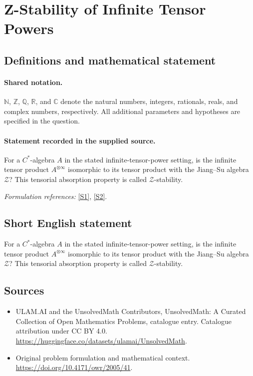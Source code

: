 \documentclass[11pt]{article}
\newcommand{\sref}[2]{\hyperlink{source:#1:#2}{[S#2]}}
\begin{document}
\section{Z-Stability of Infinite Tensor Powers}\label{statement}

\subsection{Definitions and mathematical statement}

\paragraph{Shared notation.}$\mathbb N$, $\mathbb Z$, $\mathbb Q$, $\mathbb R$, and $\mathbb C$ denote the natural numbers, integers, rationals, reals, and complex numbers, respectively. All additional parameters and hypotheses are specified in the question.


\paragraph{Statement recorded in the supplied source.}
For a $C^*$-algebra $A$ in the stated infinite-tensor-power setting, is the infinite tensor product $A^{\otimes\infty}$ isomorphic to its tensor product with the Jiang--Su algebra $\mathcal Z$? This tensorial absorption property is called $\mathcal Z$-stability.
\par\smallskip\textit{Formulation references:} \sref{statement}{1}, \sref{statement}{2}.
\subsection{Short English statement}
For a $C^*$-algebra $A$ in the stated infinite-tensor-power setting, is the infinite tensor product $A^{\otimes\infty}$ isomorphic to its tensor product with the Jiang--Su algebra $\mathcal Z$? This tensorial absorption property is called $\mathcal Z$-stability.
\subsection{Sources}
\begin{itemize}
\item[\hypertarget{source:statement:1}{S1}] ULAM.AI and the UnsolvedMath Contributors, UnsolvedMath: A Curated Collection of Open Mathematics Problems, catalogue entry. Catalogue attribution under CC BY 4.0.
\url{https://huggingface.co/datasets/ulamai/UnsolvedMath}.
\item[\hypertarget{source:statement:2}{S2}] Original problem formulation and mathematical context.
\url{https://doi.org/10.4171/owr/2005/41}.
\end{itemize}
\label{end:statement}
\end{document}

